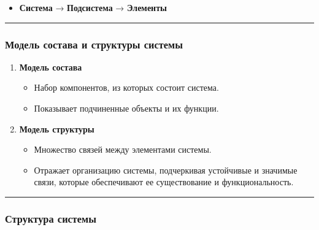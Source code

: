 \documentclass[
]{article}
\providecommand{\tightlist}{%
  \setlength{\itemsep}{0pt}\setlength{\parskip}{0pt}}
\begin{document}
\begin{itemize}
\tightlist
\item
  \textbf{Система} → \textbf{Подсистема} → \textbf{Элементы}
\end{itemize}

\begin{center}\rule{0.5\linewidth}{0.5pt}\end{center}

\subsubsection{\texorpdfstring{\textbf{Модель состава и структуры
системы}}{Модель состава и структуры системы}}\label{ux43cux43eux434ux435ux43bux44c-ux441ux43eux441ux442ux430ux432ux430-ux438-ux441ux442ux440ux443ux43aux442ux443ux440ux44b-ux441ux438ux441ux442ux435ux43cux44b}

\begin{enumerate}
\def\labelenumi{\arabic{enumi}.}
\item
  \textbf{Модель состава}

  \begin{itemize}
  \tightlist
  \item
    Набор компонентов, из которых состоит система.
  \item
    Показывает подчиненные объекты и их функции.
  \end{itemize}
\item
  \textbf{Модель структуры}

  \begin{itemize}
  \tightlist
  \item
    Множество связей между элементами системы.
  \item
    Отражает организацию системы, подчеркивая устойчивые и значимые
    связи, которые обеспечивают ее существование и функциональность.
  \end{itemize}
\end{enumerate}

\begin{center}\rule{0.5\linewidth}{0.5pt}\end{center}

\subsubsection{\texorpdfstring{\textbf{Структура
системы}}{Структура системы}}\label{ux441ux442ux440ux443ux43aux442ux443ux440ux430-ux441ux438ux441ux442ux435ux43cux44b}
\end{document}
